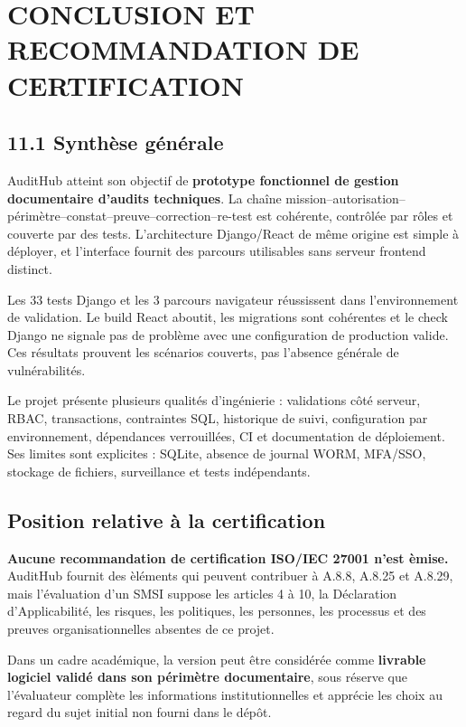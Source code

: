 \chapter{CONCLUSION ET RECOMMANDATION DE CERTIFICATION}

\section*{11.1 Synth\`ese g\'en\'erale}
AuditHub atteint son objectif de \textbf{prototype fonctionnel de gestion documentaire d'audits techniques}. La cha\^ine mission--autorisation--p\'erim\`etre--constat--preuve--correction--re-test est coh\'erente, contr\^ol\'ee par r\^oles et couverte par des tests. L'architecture Django/React de m\^eme origine est simple \`a d\'eployer, et l'interface fournit des parcours utilisables sans serveur frontend distinct.

Les 33 tests Django et les 3 parcours navigateur r\'eussissent dans l'environnement de validation. Le build React aboutit, les migrations sont coh\'erentes et le check Django ne signale pas de probl\`eme avec une configuration de production valide. Ces r\'esultats prouvent les sc\'enarios couverts, pas l'absence g\'en\'erale de vuln\'erabilit\'es.

Le projet pr\'esente plusieurs qualit\'es d'ing\'enierie : validations c\^ot\'e serveur, RBAC, transactions, contraintes SQL, historique de suivi, configuration par environnement, d\'ependances verrouill\'ees, CI et documentation de d\'eploiement. Ses limites sont explicites : SQLite, absence de journal WORM, MFA/SSO, stockage de fichiers, surveillance et tests ind\'ependants.

\section*{Position relative \`a la certification}
\textbf{Aucune recommandation de certification ISO/IEC 27001 n'est \`emise.} AuditHub fournit des \`el\'ements qui peuvent contribuer \`a A.8.8, A.8.25 et A.8.29, mais l'\'evaluation d'un SMSI suppose les articles 4 \`a 10, la D\'eclaration d'Applicabilit\'e, les risques, les politiques, les personnes, les processus et des preuves organisationnelles absentes de ce projet.

Dans un cadre acad\'emique, la version peut \^etre consid\'er\'ee comme \textbf{livrable logiciel valid\'e dans son p\'erim\`etre documentaire}, sous r\'eserve que l'\'evaluateur compl\`ete les informations institutionnelles et appr\'ecie les choix au regard du sujet initial non fourni dans le d\'ep\^ot.

